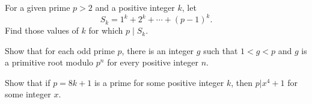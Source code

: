 \documentclass{subfile}
\begin{document}
	\begin{problem}
		For a given prime $p > 2$ and a positive integer $k$, let \[ S_k = 1^k + 2^k + \cdots + (p - 1)^k.\] Find those values of $k$ for which $p \mid S_k$. %
	\end{problem}
	
	
	\begin{problem}
		Show that for each odd prime $p$, there is an integer $g$ such that $1<g<p$ and $g$ is a primitive root modulo $p^n$ for every positive integer $n$. %
	\end{problem}
	
	
	\begin{problem}
		Show that if $p=8k+1$ is a prime for some positive integer $k$, then $p|x^4+1$ for some integer $x$. %
	\end{problem}
	
\end{document}
